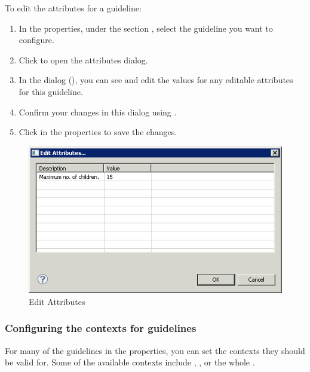 To edit the attributes for a guideline:
\begin{enumerate}
\item In the \gdproject{} properties, under the section , select the guideline you want to configure.
\item Click  to open the attributes dialog.
\item In the dialog (), you can see and edit the values for any editable attributes for this guideline. 
\item Confirm your changes in this dialog using .
\item Click  in the \gdproject{} properties to save the changes. 
\end{enumerate}
\begin{figure}[p]
\begin{center}
\includegraphics{Tasks/Teststyle/PS/attributes}
\caption{Edit Attributes}
\label{attributes}
\end{center}
\end{figure}


\subsubsection{Configuring the contexts for guidelines}
\label{TeststyleContexts}

For many of the guidelines in the \gdproject{} properties, you can set the contexts they should be valid for. Some of the available contexts include \gdcases{}, \gdsuites{}, or the whole \gdproject{}. 

